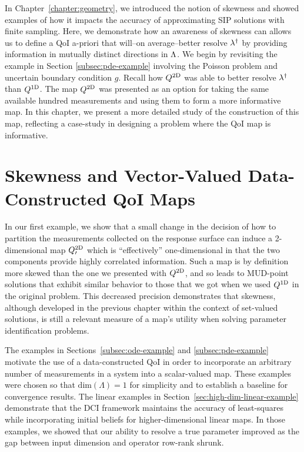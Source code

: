 
In Chapter~\ref{chapter:geometry}, we introduced the notion of skewness and showed examples of how it impacts the accuracy of approximating SIP solutions with finite sampling.
Here, we demonstrate how an awareness of skewness can allows us to define a QoI a-priori that will\---on average\---better resolve $\lambda^\dagger$ by providing information in mutually distinct directions in ${\Lambda}$.
We begin by revisiting the example in Section \ref{subsec:pde-example} involving the Poisson problem and uncertain boundary condition $g$.
Recall how $Q^\text{2D}$ was able to better resolve $\lambda^\dagger$ than $Q^\text{1D}$.
The map $Q^\text{2D}$ was presented as an option for taking the same available hundred measurements and using them to form a more informative map.
In this chapter, we present a more detailed study of the construction of this map, reflecting a case-study in designing a problem where the QoI map is informative.

\section{Skewness and Vector-Valued Data-Constructed QoI Maps}
In our first example, we show that a small change in the decision of how to partition the measurements collected on the response surface can induce a 2-dimensional map $Q^\text{2D}_\prime$ which is ``effectively'' one-dimensional in that the two components provide highly correlated information.
Such a map is by definition more skewed than the one we presented with $Q^\text{2D}$, and so leads to MUD-point solutions that exhibit similar behavior to those that we got when we used $Q^\text{1D}$ in the original problem.
This decreased precision demonstrates that skewness, although developed in the previous chapter within the context of set-valued solutions, is still a relevant measure of a map's utility when solving parameter identification problems.

The examples in Sections~\ref{subsec:ode-example} and \ref{subsec:pde-example} motivate the use of a data-constructed QoI in order to incorporate an arbitrary number of measurements in a system into a scalar-valued map.
These examples were chosen so that $\text{dim}({\Lambda}) = 1$ for simplicity and to establish a baseline for convergence results.
The linear examples in Section~\ref{sec:high-dim-linear-example} demonstrate that the DCI framework maintains the accuracy of least-squares while incorporating initial beliefs for higher-dimensional linear maps.
In those examples, we showed that our ability to resolve a true parameter improved as the gap between input dimension and operator row-rank shrunk.

